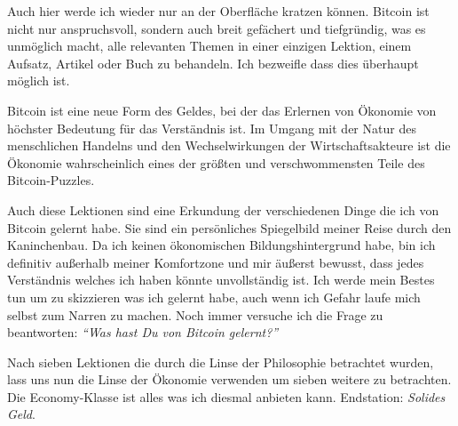 Auch hier werde ich wieder nur an der Oberfläche kratzen können. Bitcoin ist
nicht nur anspruchsvoll, sondern auch breit gefächert und tiefgründig, was es
unmöglich macht, alle relevanten Themen in einer einzigen Lektion, einem
Aufsatz, Artikel oder Buch zu behandeln. Ich bezweifle dass dies überhaupt
möglich ist.

Bitcoin ist eine neue Form des Geldes, bei der das Erlernen von Ökonomie von
höchster Bedeutung für das Verständnis ist. Im Umgang mit der Natur des
menschlichen Handelns und den Wechselwirkungen der Wirtschaftsakteure ist die
Ökonomie wahrscheinlich eines der größten und verschwommensten Teile des
Bitcoin-Puzzles.

Auch diese Lektionen sind eine Erkundung der verschiedenen Dinge die ich von
Bitcoin gelernt habe. Sie sind ein persönliches Spiegelbild meiner Reise durch
den Kaninchenbau. Da ich keinen ökonomischen Bildungshintergrund habe, bin ich
definitiv außerhalb meiner Komfortzone und mir äußerst bewusst, dass jedes
Verständnis welches ich haben könnte unvollständig ist. Ich werde mein Bestes
tun um zu skizzieren was ich gelernt habe, auch wenn ich Gefahr laufe mich
selbst zum Narren zu machen. Noch immer versuche ich die Frage zu beantworten:
\textit{\enquote{Was hast Du von Bitcoin gelernt?}}

Nach sieben Lektionen die durch die Linse der Philosophie betrachtet wurden,
lass uns nun die Linse der Ökonomie verwenden um sieben weitere zu betrachten.
Die Economy-Klasse ist alles was ich diesmal anbieten kann. Endstation:
\textit{Solides Geld}.

